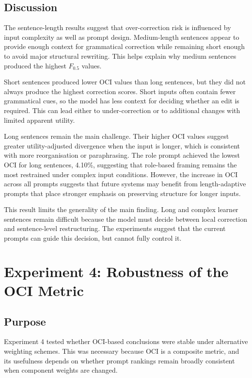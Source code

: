 \subsection{Discussion}

The sentence-length results suggest that over-correction risk is influenced by input complexity as well as prompt design. Medium-length sentences appear to provide enough context for grammatical correction while remaining short enough to avoid major structural rewriting. This helps explain why medium sentences produced the highest $F_{0.5}$ values.

Short sentences produced lower OCI values than long sentences, but they did not always produce the highest correction scores. Short inputs often contain fewer grammatical cues, so the model has less context for deciding whether an edit is required. This can lead either to under-correction or to additional changes with limited apparent utility.

Long sentences remain the main challenge. Their higher OCI values suggest greater utility-adjusted divergence when the input is longer, which is consistent with more reorganisation or paraphrasing. The role prompt achieved the lowest OCI for long sentences, 4.10\%, suggesting that role-based framing remains the most restrained under complex input conditions. However, the increase in OCI across all prompts suggests that future systems may benefit from length-adaptive prompts that place stronger emphasis on preserving structure for longer inputs.

This result limits the generality of the main finding. Long and complex learner sentences remain difficult because the model must decide between local correction and sentence-level restructuring. The experiments suggest that the current prompts can guide this decision, but cannot fully control it.

\section{Experiment 4: Robustness of the OCI Metric}

\subsection{Purpose}

Experiment 4 tested whether OCI-based conclusions were stable under alternative weighting schemes. This was necessary because OCI is a composite metric, and its usefulness depends on whether prompt rankings remain broadly consistent when component weights are changed.

